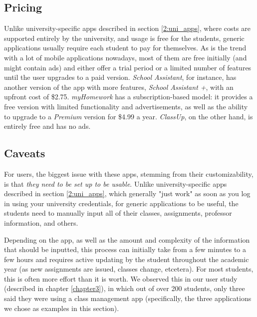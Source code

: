     \subsection{Pricing} \label{2:generic_apps_pricing}
        Unlike university-specific apps described in section \ref{2:uni_apps}, where costs are supported entirely by the university, and usage is free for the students, generic applications usually require each student to pay for themselves. As is the trend with a lot of mobile applications nowadays, most of them are free initially (and might contain ads) and either offer a trial period or a limited number of features until the user upgrades to a paid version. \textit{School Assistant}, for instance, has another version of the app with more features, \textit{School Assistant +}, with an upfront cost of \$2.75. \textit{myHomework} has a subscription-based model: it provides a free version with limited functionality and advertisements, as well as the ability to upgrade to a \textit{Premium} version for \$4.99 a year. \textit{ClassUp}, on the other hand, is entirely free and has no ads.
        
    \subsection{Caveats} \label{2:generic_apps_caveats}
        For users, the biggest issue with these apps, stemming from their customizability, is that \textit{they need to be set up to be usable}. Unlike university-specific apps described in section \ref{2:uni_apps}, which generally "just work" as soon as you log in using your university credentials, for generic applications to be useful, the students need to manually input all of their classes, assignments, professor information, and others. 
        
        Depending on the app, as well as the amount and complexity of the information that should be inputted, this process can initially take from a few minutes to a few hours and requires active updating by the student throughout the academic year (as new assignments are issued, classes change, etcetera). For most students, this is often more effort than it is worth. We observed this in our user study (described in chapter \ref{chapter3}), in which out of over 200 students, only three said they were using a class management app (specifically, the three applications we chose as examples in this section).
        


